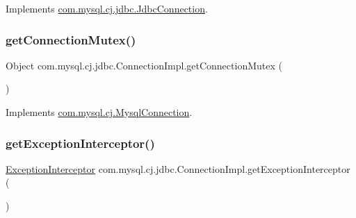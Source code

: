 Implements \mbox{\hyperlink{interfacecom_1_1mysql_1_1cj_1_1jdbc_1_1_jdbc_connection_ab3325dceec74bde20215836ade6845ad}{com.\+mysql.\+cj.\+jdbc.\+Jdbc\+Connection}}.

\mbox{\label{classcom_1_1mysql_1_1cj_1_1jdbc_1_1_connection_impl_a2d5f7dcbb793d20fce3c805a2ad96b80}} 
\subsubsection{\texorpdfstring{get\+Connection\+Mutex()}{getConnectionMutex()}}
{\footnotesize\ttfamily Object com.\+mysql.\+cj.\+jdbc.\+Connection\+Impl.\+get\+Connection\+Mutex (\begin{DoxyParamCaption}{ }\end{DoxyParamCaption})}



Implements \mbox{\hyperlink{interfacecom_1_1mysql_1_1cj_1_1_mysql_connection_a9509cf17d31eff921de41b8ecd03278f}{com.\+mysql.\+cj.\+Mysql\+Connection}}.

\mbox{\label{classcom_1_1mysql_1_1cj_1_1jdbc_1_1_connection_impl_a9333bafa5720993c7b74f73e07710388}} 
\subsubsection{\texorpdfstring{get\+Exception\+Interceptor()}{getExceptionInterceptor()}}
{\footnotesize\ttfamily \mbox{\hyperlink{interfacecom_1_1mysql_1_1cj_1_1exceptions_1_1_exception_interceptor}{Exception\+Interceptor}} com.\+mysql.\+cj.\+jdbc.\+Connection\+Impl.\+get\+Exception\+Interceptor (\begin{DoxyParamCaption}{ }\end{DoxyParamCaption})}



